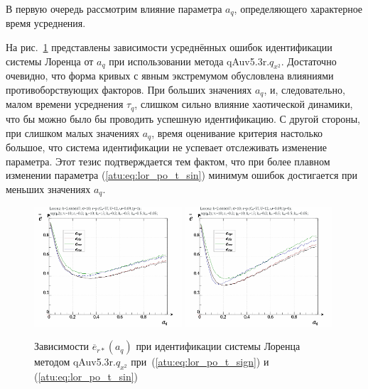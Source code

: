В первую очередь рассмотрим влияние параметра
$a_q$, определяющего характерное время усреднения.

На рис.~\ref{atu:f:lor_a_q_qAuv5.3r.q_x2} представлены зависимости
усреднённых ошибок идентификации системы Лоренца от $a_q$ при использовании метода qAuv5.3r.$q_{x^2}$.
Достаточно очевидно, что форма кривых с явным экстремумом обусловлена
влияниями противоборствующих факторов. При больших значениях $a_q$,
и, следовательно, малом времени усреднения $\tau_q$,
слишком сильно влияние хаотической динамики, что бы можно было бы
проводить успешную идентификацию. С другой стороны,
при слишком малых значениях $a_q$, время оценивание критерия настолько большое,
что система идентификации не успевает отслеживать изменение параметра.
Этот тезис подтверждается тем фактом, что при более плавном изменении параметра
(\ref{atu:eq:lor_po_t_sin})
минимум ошибок достигается при меньших значениях $a_q$.

\begin{figure}[h!]
  \centerline{
    \includegraphics[width=0.49\textwidth]{p/cha/lor/qAuv5.3r/lor_qAuv5_3r_qx2-p_a_q_e_sign.png}
    \hfill
    \includegraphics[width=0.49\textwidth]{p/cha/lor/qAuv5.3r/lor_qAuv5_3r_qx2-p_a_q_e_sin.png}
  }
  \caption{Зависимости $\overline{e}_{r*}(a_q)$ при идентификации системы Лоренца методом qAuv5.3r.$q_{x^2}$
   при~(\ref{atu:eq:lor_po_t_sign}) и (\ref{atu:eq:lor_po_t_sin})}
  \label{atu:f:lor_a_q_qAuv5.3r.q_x2}
\end{figure}


